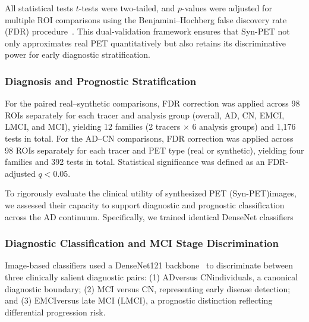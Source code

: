 \documentclass{article}
\providecommand{\DIFaddtex}[1]{{\protect\color{blue} \sf #1}} %
\providecommand{\DIFdeltex}[1]{{\protect\color{red} \scriptsize #1}} %
\providecommand{\DIFaddbegin}{} %
\providecommand{\DIFaddend}{} %
\providecommand{\DIFdelbegin}{} %
\providecommand{\DIFdelend}{} %
\providecommand{\DIFadd}[1]{\texorpdfstring{\DIFaddtex{#1}}{#1}} %
\providecommand{\DIFdel}[1]{\texorpdfstring{\DIFdeltex{#1}}{}} %
\newcommand{\DIFscaledelfig}{0.5}
\newlength{\DIFdelgraphicswidth} %
\newlength{\DIFdelgraphicsheight} %
\newcommand{\DIFaddincludegraphics}[2][]{{\color{blue}\fbox{\DIFOincludegraphics[#1]{#2}}}} %
\newcommand{\DIFdelincludegraphics}[2][]{%
\sbox{\DIFdelgraphicsbox}{\DIFOincludegraphics[#1]{#2}}%
\settoboxwidth{\DIFdelgraphicswidth}{\DIFdelgraphicsbox} %
\settoboxtotalheight{\DIFdelgraphicsheight}{\DIFdelgraphicsbox} %
\scalebox{\DIFscaledelfig}{%
\parbox[b]{\DIFdelgraphicswidth}{\usebox{\DIFdelgraphicsbox}\\[-\baselineskip] \rule{\DIFdelgraphicswidth}{0em}}\llap{\resizebox{\DIFdelgraphicswidth}{\DIFdelgraphicsheight}{%
\setlength{\unitlength}{\DIFdelgraphicswidth}%
\begin{picture}(1,1)%
\thicklines\linethickness{2pt} %
{\color[rgb]{1,0,0}\put(0,0){\framebox(1,1){}}}%
{\color[rgb]{1,0,0}\put(0,0){\line( 1,1){1}}}%
{\color[rgb]{1,0,0}\put(0,1){\line(1,-1){1}}}%
\end{picture}%
}\hspace*{3pt}}} %
} %
\DeclareRobustCommand{\DIFaddbegin}{\DIFOaddbegin \let\includegraphics\DIFaddincludegraphics} %
\DeclareRobustCommand{\DIFaddend}{\DIFOaddend \let\includegraphics\DIFOincludegraphics} %
\DeclareRobustCommand{\DIFdelbegin}{\DIFOdelbegin \let\includegraphics\DIFdelincludegraphics} %
\DeclareRobustCommand{\DIFdelend}{\DIFOaddend \let\includegraphics\DIFOincludegraphics} %
\begin{document}
All \DIFdelbegin \DIFdel{statistical tests }\DIFdelend \DIFaddbegin \DIFadd{$t$-tests }\DIFaddend were two-tailed, and $p$-values were adjusted for multiple ROI comparisons using the \DIFaddbegin \DIFadd{Benjamini--Hochberg }\DIFaddend false discovery rate (FDR) procedure~\cite{benjamini1995controlling}. \DIFdelbegin \DIFdel{This dual-validation framework ensures that Syn-PET not only approximates real PET quantitatively but also retains its discriminative power for early diagnostic stratification. }%

\subsubsection{\DIFdel{Diagnosis and Prognostic Stratification}}
\addtocounter{subsubsection}{-1}%
\DIFdelend \DIFaddbegin \DIFadd{For the paired real--synthetic comparisons, FDR correction was applied across 98 ROIs separately for each tracer and analysis group (overall, AD, CN, EMCI, LMCI, and MCI), yielding 12 families (2 tracers $\times$ 6 analysis groups) and 1,176 tests in total. For the AD--CN comparisons, FDR correction was applied across 98 ROIs separately for each tracer and PET type (real or synthetic), yielding four families and 392 tests in total. Statistical significance was defined as an FDR-adjusted $q<0.05$.
}\DIFaddend 

\DIFdelbegin \DIFdel{To rigorously evaluate the clinical utility of synthesized PET (Syn-PET)images, we assessed their capacity to support diagnostic and prognostic classification across the AD continuum. Specifically, we trained identical DenseNet classifiers }\DIFdelend \DIFaddbegin \subsubsection{\DIFadd{Diagnostic Classification and MCI Stage Discrimination}}
\DIFadd{Image-based classifiers used a DenseNet121 backbone}\DIFaddend ~\cite{huang2017densely} to \DIFdelbegin \DIFdel{discriminate between three clinically salient diagnostic pairs: (1)  ADversus CNindividuals, a canonical diagnostic boundary; (2)  MCI versus CN, representing early disease detection; and (3) EMCIversus late MCI (LMCI), a prognostic distinction reflecting differential progression risk. }%
\end{document}
